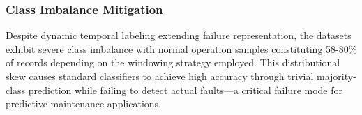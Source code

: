 \documentclass[12pt]{article}
\begin{document}


\subsubsection{Class Imbalance Mitigation}
\label{subsubsec:class_balancing}

Despite dynamic temporal labeling extending failure representation, the datasets exhibit severe class imbalance with normal operation samples constituting 58-80\% of records depending on the windowing strategy employed. This distributional skew causes standard classifiers to achieve high accuracy through trivial majority-class prediction while failing to detect actual faults—a critical failure mode for predictive maintenance applications.
\end{document}
